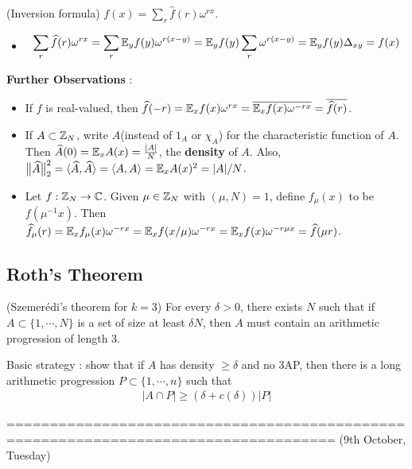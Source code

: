 \documentclass[10pt,a4paper]{report}
\renewcommand{\hat}{\widehat}
\begin{document}
(Inversion formula)  $f(x) = \sum_{r} \hat{f}(r)\omega^{rx}$.
\begin{itemize}
\item[ ] \pf
\begin{align*}
\sum_{r} \hat{f}(r) \omega^{rx} = \sum_r \avg_y f(y) \omega^{r(x-y)} = \avg_y f(y) \sum_r \omega^{r(x-y)} = \avg_y f(y) \Delta_{xy}  = f(x)
\end{align*}
\eop

\end{itemize}
\s

\textbf{Further Observations} :

\begin{itemize}
\item If $f$ is real-valued, then $\hat{f}(-r) = \avg_x f(x) \omega^{rx} = \bar{\avg_x f(x) \omega^{-rx}} = \overline{ \hat{f}(r) }$.

\item If $A\subset \mathbb{Z}_N$, write $A$(instead of $1_A$ or $\chi_A$) for the characteristic function of $A$. Then $\hat{A}(0) = \avg_x A(x) = \frac{|A|}{N}$, the \textbf{density} of $A$. Also, $\norms{\hat{A}}{2}^2 = \langle \hat{A}, \hat{A} \rangle = \langle A,A \rangle = \avg_x A(x)^2 = |A|/N$.

\item Let $f: \mathbb{Z}_N \rightarrow \mathbb{C}$. Given $\mu \in \mathbb{Z}_N$ with $(\mu, N)=1$, define $f_{\mu}(x)$ to be $f(\mu^{-1}x)$. Then $\hat{f}_{\mu}(r) = \avg_x f_{\mu}(x)\omega^{-rx} = \avg_x f(x/\mu) \omega^{-rx} = \avg_x f(x)\omega^{-r\mu x} = \hat{f}(\mu r)$.
\end{itemize}

\subsection*{Roth's Theorem}
\s

(Szemer\'{e}di's theorem for $k=3$) For every $\delta >0$, there exists $N$ such that if $A \subset \{1, \cdots, N\}$ is a set of size at least $\delta N$, then $A$ must contain an arithmetic progression of length 3. 

\s

Basic strategy : show that if $A$ has density $\geq \delta$ and no 3AP, then there is a long arithmetic progression $P \subset \{1,\cdots,n\}$ such that
\begin{align*}
|A\cap P| \geq (\delta + c(\delta)) |P|
\end{align*}

====================================================================================
(9th October, Tuesday)
\s
\end{document}
